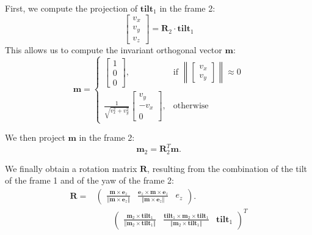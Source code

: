\documentclass{IJCAS}
\begin{document}
First, we compute the projection of $\boldsymbol{tilt}_1$ in the frame 2:
\begin{equation}
    \begin{bmatrix} v_x \\ v_y \\ v_z \end{bmatrix} = \boldsymbol{R}_{2} \cdot \boldsymbol{tilt}_1
\end{equation}
This allows us to compute the invariant orthogonal vector $\boldsymbol{m}$:
\begin{equation}
    \boldsymbol{m} = 
    \begin{cases}
        \begin{bmatrix} 1 \\ 0 \\ 0 \end{bmatrix}, & \text{if } \left\| \begin{bmatrix} v_x \\ v_y \end{bmatrix} \right\| \approx 0 \\[12pt]
        \frac{1}{\sqrt{v_x^2 + v_y^2}}
        \begin{bmatrix} v_y \\ - v_x \\ 0 \end{bmatrix}, & \text{otherwise}
    \end{cases}
\end{equation}

We then project $\boldsymbol{m}$ in the frame 2:
\begin{equation}
    \boldsymbol{m}_2 = \boldsymbol{R}_2^T \boldsymbol{m}.
\end{equation}

We finally obtain a rotation matrix $\boldsymbol{R}$, resulting from the combination of the tilt of the frame 1 and of the yaw of the frame 2:
\begin{align}
    \boldsymbol{R} = &\left(\begin{array}{ccc}
    \frac{\boldsymbol{m} \times \boldsymbol{e}_z}{\left\Vert \boldsymbol{m} \times \boldsymbol{e}_z \right\Vert} & 
    \frac{\boldsymbol{e}_z \times \boldsymbol{m} \times \boldsymbol{e}_z}{\left\Vert \boldsymbol{m} \times \boldsymbol{e}_z \right\Vert} & 
    e_z
    \end{array}\right) . \nonumber \\ 
    & \qquad \left(\begin{array}{ccc} 
    \frac{\boldsymbol{m}_2 \times \boldsymbol{tilt}_{1}}{\left\Vert \boldsymbol{m}_2 \times \boldsymbol{tilt}_{1} \right\Vert} & 
    \frac{\boldsymbol{tilt}_{1} \times \boldsymbol{m}_2 \times \boldsymbol{tilt}_{1}}{\left\Vert \boldsymbol{m}_2 \times \boldsymbol{tilt}_{1} \right\Vert} & 
    \boldsymbol{tilt}_{1}
    \end{array}\right)^T \label{eq:axis_agnostic_R} 
\end{align}
\end{document}
